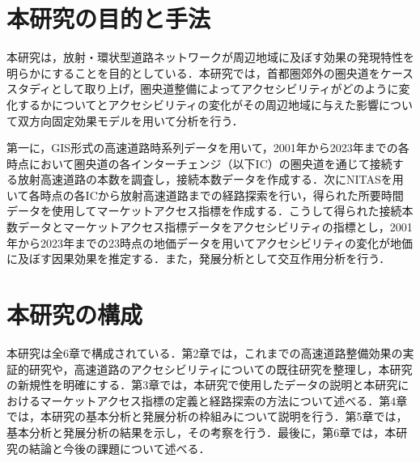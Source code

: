 \section{本研究の目的と手法}

本研究は，放射・環状型道路ネットワークが周辺地域に及ぼす効果の発現特性を明らかにすることを目的としている．本研究では，首都圏郊外の圏央道をケーススタディとして取り上げ，圏央道整備によってアクセシビリティがどのように変化するかについてとアクセシビリティの変化がその周辺地域に与えた影響について双方向固定効果モデルを用いて分析を行う．

第一に，GIS形式の高速道路時系列データを用いて，2001年から2023年までの各時点において圏央道の各インターチェンジ（以下IC）の圏央道を通じて接続する放射高速道路の本数を調査し，接続本数データを作成する．次にNITASを用いて各時点の各ICから放射高速道路までの経路探索を行い，得られた所要時間データを使用してマーケットアクセス指標を作成する．こうして得られた接続本数データとマーケットアクセス指標データをアクセシビリティの指標とし，2001年から2023年までの23時点の地価データを用いてアクセシビリティの変化が地価に及ぼす因果効果を推定する．また，発展分析として交互作用分析を行う．

\section{本研究の構成}

本研究は全6章で構成されている．第2章では，これまでの高速道路整備効果の実証的研究や，高速道路のアクセシビリティについての既往研究を整理し，本研究の新規性を明確にする．第3章では，本研究で使用したデータの説明と本研究におけるマーケットアクセス指標の定義と経路探索の方法について述べる．第4章では，本研究の基本分析と発展分析の枠組みについて説明を行う．第5章では，基本分析と発展分析の結果を示し，その考察を行う．最後に，第6章では，本研究の結論と今後の課題について述べる．

